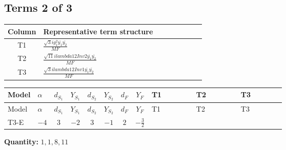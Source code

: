 \documentclass[8pt]{article}
\begin{document}
\begin{landscape}
\subsection*{Terms 2 of 3}
\begin{center}
\begin{tabular}{@{}c >{\raggedright\arraybackslash}p{0.82\linewidth}@{}}
\toprule
Column & Representative term structure \\
\midrule
T1 & \(\displaystyle \frac{\sqrt{3} i g_{1}^{2} \overline{y_{1}} \overline{y_{2}}}{MF}\) \\
\midrule
T2 & \(\displaystyle \frac{\sqrt{11} i lambda12Inv2 \overline{y_{1}} \overline{y_{2}}}{MF}\) \\
\midrule
T3 & \(\displaystyle \frac{\sqrt{3} i lambda12Inv1 \overline{y_{1}} \overline{y_{2}}}{MF}\) \\
\midrule
\bottomrule
\end{tabular}
\end{center}
\smallskip
\tiny
\begin{longtable}{@{}llcccccc >{\raggedright\arraybackslash}p{0.21\linewidth} >{\raggedright\arraybackslash}p{0.21\linewidth} >{\raggedright\arraybackslash}p{0.21\linewidth}@{}}
\toprule
Model & $\alpha$ & $d_{S_1}$ & $Y_{S_1}$ & $d_{S_2}$ & $Y_{S_2}$ & $d_F$ & $Y_F$ & T1 & T2 & T3 \\
\midrule
\endfirsthead
\toprule
Model & $\alpha$ & $d_{S_1}$ & $Y_{S_1}$ & $d_{S_2}$ & $Y_{S_2}$ & $d_F$ & $Y_F$ & T1 & T2 & T3 \\
\midrule
\endhead
T3-E & $-4$ & $3$ & $-2$ & $3$ & $-1$ & $2$ & $-\frac{3}{2}$ & \scriptsize\adjustbox{max width=\linewidth}{$\begin{gathered} - \frac{9 \sqrt{3} i g_{1}^{2} \overline{y_{1}} \overline{y_{2}}}{8 MF}\end{gathered}$} & \scriptsize\adjustbox{max width=\linewidth}{$\begin{gathered} - \frac{3 \sqrt{11} i lambda12Inv2 \overline{y_{1}} \overline{y_{2}}}{22 MF}\end{gathered}$} & \scriptsize\adjustbox{max width=\linewidth}{$\begin{gathered} \frac{\sqrt{3} i lambda12Inv1 \overline{y_{1}} \overline{y_{2}}}{6 MF}\end{gathered}$} \\
\midrule
\bottomrule
\end{longtable}
\clearpage
\noindent\textbf{Quantity: }$\mathrm{1,1,8,11}$\par\smallskip

\end{landscape}
\end{document}
